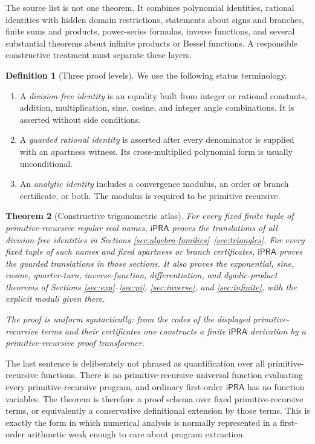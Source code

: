 \documentclass[11pt]{article}
\newtheorem{theorem}{Theorem}[section]
\theoremstyle{definition}
\newtheorem{definition}[theorem]{Definition}
\newcommand{\iPRA}{\mathsf{iPRA}}
\begin{document}
The source list is not one theorem.  It combines polynomial identities, rational
identities with hidden domain restrictions, statements about signs and branches,
finite sums and products, power-series formulas, inverse functions, and several
substantial theorems about infinite products or Bessel functions.  A responsible
constructive treatment must separate these layers.

\begin{definition}[Three proof levels]
We use the following status terminology.
\begin{enumerate}[label=\textup{(\roman*)}]
\item A \emph{division-free identity} is an equality built from integer or
rational constants, addition, multiplication, sine, cosine, and integer angle
combinations.  It is asserted without side conditions.
\item A \emph{guarded rational identity} is asserted after every denominator is
supplied with an apartness witness.  Its cross-multiplied polynomial form is
usually unconditional.
\item An \emph{analytic identity} includes a convergence modulus, an order or
branch certificate, or both.  The modulus is required to be primitive recursive.
\end{enumerate}
\end{definition}

\begin{theorem}[Constructive trigonometric atlas]
\label{thm:atlas}
For every fixed finite tuple of primitive-recursive regular real names, \(\iPRA\)
proves the translations of all division-free identities in Sections
\ref{sec:algebra-families}--\ref{sec:triangles}.  For every fixed tuple of such
names and fixed apartness or branch certificates, \(\iPRA\) proves the guarded
translations in those sections.  It also proves the exponential, sine, cosine,
quarter-turn, inverse-function, differentiation, and dyadic-product theorems of
Sections \ref{sec:exp}--\ref{sec:pi}, \ref{sec:inverse}, and
\ref{sec:infinite}, with the explicit moduli given there.

The proof is uniform syntactically: from the codes of the displayed
primitive-recursive terms and their certificates one constructs a finite
\(\iPRA\) derivation by a primitive-recursive proof transformer.
\end{theorem}

The last sentence is deliberately not phrased as quantification over all
primitive-recursive functions.  There is no primitive-recursive universal
function evaluating every primitive-recursive program, and ordinary first-order
\(\iPRA\) has no function variables.  The theorem is therefore a proof schema
over fixed primitive-recursive terms, or equivalently a conservative definitional
extension by those terms.  This is exactly the form in which numerical analysis
is normally represented in a first-order arithmetic weak enough to care about
program extraction.
\end{document}
